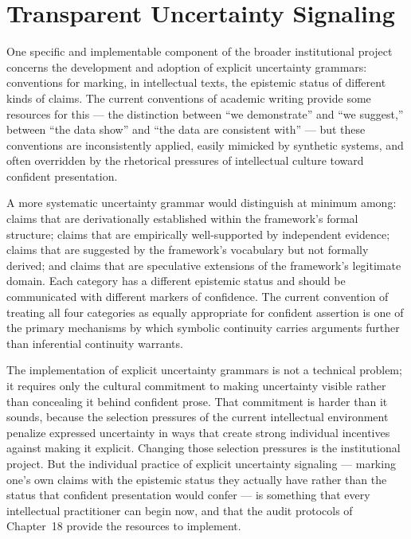 \documentclass[12pt, openright, twoside]{book}
\begin{document}
\section{Transparent Uncertainty Signaling}

One specific and implementable component of the broader institutional
project concerns the development and adoption of explicit uncertainty
grammars: conventions for marking, in intellectual texts, the epistemic
status of different kinds of claims. The current conventions of academic
writing provide some resources for this --- the distinction between
``we demonstrate'' and ``we suggest,'' between ``the data show'' and
``the data are consistent with'' --- but these conventions are
inconsistently applied, easily mimicked by synthetic systems, and often
overridden by the rhetorical pressures of intellectual culture toward
confident presentation.

A more systematic uncertainty grammar would distinguish at minimum
among: claims that are derivationally established within the framework's
formal structure; claims that are empirically well-supported by
independent evidence; claims that are suggested by the framework's
vocabulary but not formally derived; and claims that are speculative
extensions of the framework's legitimate domain. Each category has a
different epistemic status and should be communicated with different
markers of confidence. The current convention of treating all four
categories as equally appropriate for confident assertion is one of
the primary mechanisms by which symbolic continuity carries arguments
further than inferential continuity warrants.

The implementation of explicit uncertainty grammars is not a technical
problem; it requires only the cultural commitment to making uncertainty
visible rather than concealing it behind confident prose. That commitment
is harder than it sounds, because the selection pressures of the current
intellectual environment penalize expressed uncertainty in ways that
create strong individual incentives against making it explicit. Changing
those selection pressures is the institutional project. But the individual
practice of explicit uncertainty signaling --- marking one's own claims
with the epistemic status they actually have rather than the status that
confident presentation would confer --- is something that every intellectual
practitioner can begin now, and that the audit protocols of Chapter~18
provide the resources to implement.

\clearpage
\end{document}
